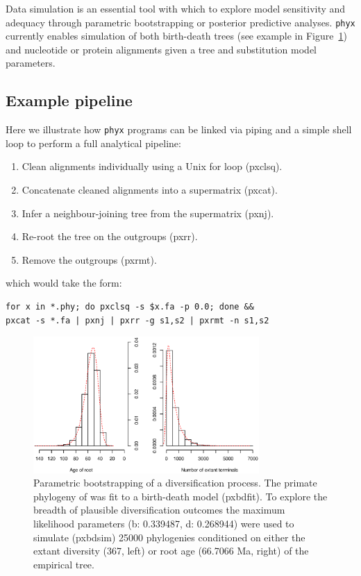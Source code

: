 \documentclass{bioinfo}
\begin{document}
\begin{methods}
Data simulation is an essential tool with which to explore model
sensitivity and adequacy through parametric bootstrapping or posterior
predictive analyses. \texttt{phyx} currently enables simulation of both
birth-death trees (see example in Figure~\ref{fig:01}) and nucleotide or
protein alignments given a tree and substitution model parameters.

\subsection{Example pipeline}%

Here we illustrate how \texttt{phyx} programs can be linked via piping
and a simple shell loop to perform a full analytical pipeline:
\begin{enumerate}
\item Clean alignments individually using a Unix for loop (pxclsq).
\item Concatenate cleaned alignments into a supermatrix (pxcat).
\item Infer a neighbour-joining tree from the supermatrix (pxnj).
\item Re-root the tree on the outgroups (pxrr).
\item Remove the outgroups (pxrmt).
\end{enumerate}
which would take the form:

\begin{verbatim}
for x in *.phy; do pxclsq -s $x.fa -p 0.0; done &&
pxcat -s *.fa | pxnj | pxrr -g s1,s2 | pxrmt -n s1,s2
\end{verbatim}

\end{methods}

\begin{figure}[!tpb]%
\centerline{\includegraphics[width=86mm]{Fig1.eps}}
\caption{Parametric bootstrapping of a diversification process. The primate phylogeny of \cite{Springer2012} was fit to a birth-death model (pxbdfit). To explore the breadth of plausible diversification outcomes the maximum likelihood parameters (b: 0.339487, d: 0.268944) were used to simulate (pxbdsim) 25000 phylogenies conditioned on either the extant diversity (367, left) or root age (66.7066 Ma, right) of the empirical tree.}\label{fig:01}
\end{figure}
\end{document}

